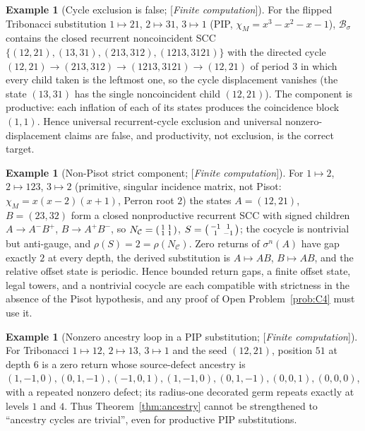 \documentclass[11pt]{amsart}
\theoremstyle{plain}
\theoremstyle{definition}
\newtheorem{example}[theorem]{Example}
\theoremstyle{remark}
\newcommand{\B}{\mathcal{B}}
\newcommand{\cC}{\mathcal{C}}
\newcommand{\Status}[1]{\textup{[\textit{#1}]}}
\begin{document}
\begin{example}[Cycle exclusion is false; \Status{Finite computation}]\label{ex:flipped}
For the flipped Tribonacci substitution $1\mapsto21$, $2\mapsto31$, $3\mapsto1$ (PIP, $\chi_M=x^3-x^2-x-1$), $\B_\sigma$ contains the closed recurrent noncoincident SCC $\{(12,21),(13,31),(213,312),(1213,3121)\}$ with the directed cycle $(12,21)\to(213,312)\to(1213,3121)\to(12,21)$ of period $3$ in which every child taken is the leftmost one, so the cycle displacement vanishes (the state $(13,31)$ has the single noncoincident child $(12,21)$). The component is productive: each inflation of each of its states produces the coincidence block $(1,1)$. Hence universal recurrent-cycle exclusion and universal nonzero-displacement claims are false, and productivity, not exclusion, is the correct target.
\end{example}

\begin{example}[Non-Pisot strict component; \Status{Finite computation}]\label{ex:nonpisot}
For $1\mapsto2$, $2\mapsto123$, $3\mapsto2$ (primitive, singular incidence matrix, not Pisot: $\chi_M=x(x-2)(x+1)$, Perron root $2$) the states $A=(12,21)$, $B=(23,32)$ form a closed nonproductive recurrent SCC with signed children $A\to A^-B^+$, $B\to A^+B^-$, so $N_\cC=\begin{psmallmatrix}1&1\\1&1\end{psmallmatrix}$, $S=\begin{psmallmatrix}-1&1\\1&-1\end{psmallmatrix}$; the cocycle is nontrivial but anti-gauge, and $\rho(S)=2=\rho(N_\cC)$. Zero returns of $\sigma^n(A)$ have gap exactly $2$ at every depth, the derived substitution is $A\mapsto AB$, $B\mapsto AB$, and the relative offset state is periodic. Hence bounded return gaps, a finite offset state, legal towers, and a nontrivial cocycle are each compatible with strictness in the absence of the Pisot hypothesis, and any proof of Open Problem~\ref{prob:C4} must use it.
\end{example}

\begin{example}[Nonzero ancestry loop in a PIP substitution; \Status{Finite computation}]\label{ex:tribonacci-loop}
For Tribonacci $1\mapsto12$, $2\mapsto13$, $3\mapsto1$ and the seed $(12,21)$, position $51$ at depth $6$ is a zero return whose source-defect ancestry is $(1,-1,0),(0,1,-1),(-1,0,1),(1,-1,0),(0,1,-1),(0,0,1),(0,0,0)$, with a repeated nonzero defect; its radius-one decorated germ repeats exactly at levels $1$ and $4$. Thus Theorem~\ref{thm:ancestry} cannot be strengthened to ``ancestry cycles are trivial'', even for productive PIP substitutions.
\end{example}
\end{document}
